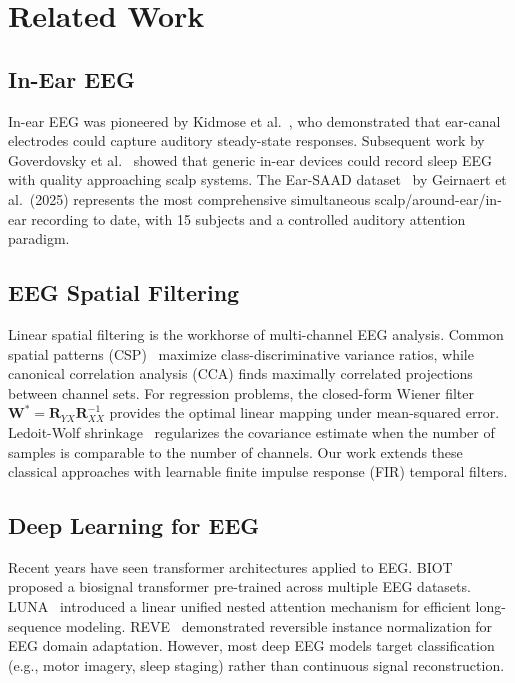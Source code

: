 \documentclass[conference]{IEEEtran}
\begin{document}
\section{Related Work}
\label{sec:related_work}

\subsection{In-Ear EEG}

In-ear EEG was pioneered by Kidmose et al.~\cite{kidmose2013study}, who demonstrated that ear-canal electrodes could capture auditory steady-state responses. Subsequent work by Goverdovsky et al.~\cite{goverdovsky2017ear} showed that generic in-ear devices could record sleep EEG with quality approaching scalp systems. The Ear-SAAD dataset~\cite{ear_saad} by Geirnaert et al.\ (2025) represents the most comprehensive simultaneous scalp/around-ear/in-ear recording to date, with 15 subjects and a controlled auditory attention paradigm.

\subsection{EEG Spatial Filtering}

Linear spatial filtering is the workhorse of multi-channel EEG analysis. Common spatial patterns (CSP)~\cite{blankertz2008csp} maximize class-discriminative variance ratios, while canonical correlation analysis (CCA) finds maximally correlated projections between channel sets. For regression problems, the closed-form Wiener filter $\mathbf{W}^* = \mathbf{R}_{YX} \mathbf{R}_{XX}^{-1}$ provides the optimal linear mapping under mean-squared error. Ledoit-Wolf shrinkage~\cite{ledoit2004well} regularizes the covariance estimate when the number of samples is comparable to the number of channels. Our work extends these classical approaches with learnable finite impulse response (FIR) temporal filters.

\subsection{Deep Learning for EEG}

Recent years have seen transformer architectures applied to EEG. BIOT~\cite{biot} proposed a biosignal transformer pre-trained across multiple EEG datasets. LUNA~\cite{luna} introduced a linear unified nested attention mechanism for efficient long-sequence modeling. REVE~\cite{reve} demonstrated reversible instance normalization for EEG domain adaptation. However, most deep EEG models target classification (e.g., motor imagery, sleep staging) rather than continuous signal reconstruction.
\end{document}
